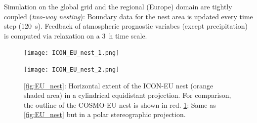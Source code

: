 Simulation on the global grid and the regional (Europe) domain are tightly coupled
(\emph{two-way nesting}):
Boundary data for the nest area is updated every time step (120~s).
%
Feedback of atmospheric prognostic variabes (except precipitation) is
computed via relaxation on a 3~h time scale.

  
\begin{figure}[h]
  \begin{minipage}[b]{\textwidth}
    \centering
    \texttt{[image: ICON\_EU\_nest\_1.png]}
    \subcaption{}\label{fig:EU_nest}
  \end{minipage}
  \hfill
  \par
  \begin{minipage}[b]{\textwidth}
    \centering
    \texttt{[image: ICON\_EU\_nest\_2.png]}
    \subcaption{}\label{fig:EU_nest_polar}
  \end{minipage}\hfill
  \caption{\ref{fig:EU_nest}: Horizontal extent of the ICON-EU nest
    (orange shaded area) in a cylindrical equidistant projection. For
    comparison, the outline of the COSMO-EU nest is shown in red.
    \ref{fig:EU_nest_polar}:  Same as \ref{fig:EU_nest} but in a polar
    stereographic projection.}
\end{figure}




